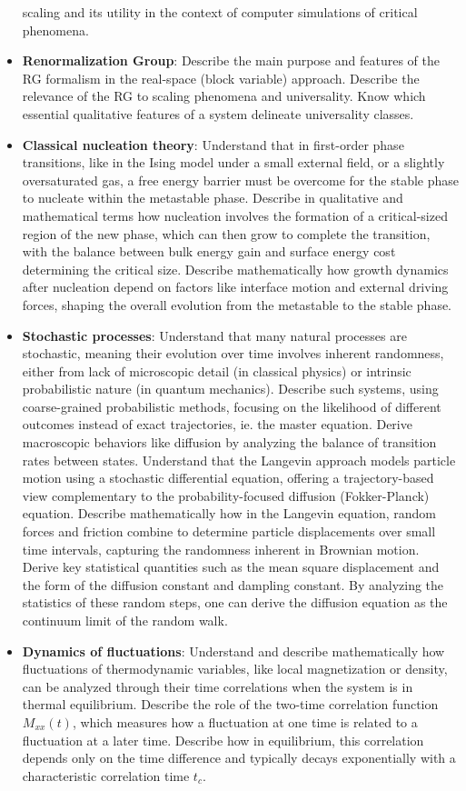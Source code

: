 \documentclass[
  letterpaper,
  enabledeprecatedfontcommands]{report}
\begin{document}
\begin{itemize}
  scaling and its utility in the context of computer simulations of
  critical phenomena.
\item
  \textbf{Renormalization Group}: Describe the main purpose and features
  of the RG formalism in the real-space (block variable) approach.
  Describe the relevance of the RG to scaling phenomena and
  universality. Know which essential qualitative features of a system
  delineate universality classes.
\item
  \textbf{Classical nucleation theory}: Understand that in first-order
  phase transitions, like in the Ising model under a small external
  field, or a slightly oversaturated gas, a free energy barrier must be
  overcome for the stable phase to nucleate within the metastable phase.
  Describe in qualitative and mathematical terms how nucleation involves
  the formation of a critical-sized region of the new phase, which can
  then grow to complete the transition, with the balance between bulk
  energy gain and surface energy cost determining the critical size.
  Describe mathematically how growth dynamics after nucleation depend on
  factors like interface motion and external driving forces, shaping the
  overall evolution from the metastable to the stable phase.
\item
  \textbf{Stochastic processes}: Understand that many natural processes
  are stochastic, meaning their evolution over time involves inherent
  randomness, either from lack of microscopic detail (in classical
  physics) or intrinsic probabilistic nature (in quantum mechanics).
  Describe such systems, using coarse-grained probabilistic methods,
  focusing on the likelihood of different outcomes instead of exact
  trajectories, ie. the master equation. Derive macroscopic behaviors
  like diffusion by analyzing the balance of transition rates between
  states. Understand that the Langevin approach models particle motion
  using a stochastic differential equation, offering a trajectory-based
  view complementary to the probability-focused diffusion
  (Fokker-Planck) equation. Describe mathematically how in the Langevin
  equation, random forces and friction combine to determine particle
  displacements over small time intervals, capturing the randomness
  inherent in Brownian motion. Derive key statistical quantities such as
  the mean square displacement and the form of the diffusion constant
  and dampling constant. By analyzing the statistics of these random
  steps, one can derive the diffusion equation as the continuum limit of
  the random walk.
\item
  \textbf{Dynamics of fluctuations}: Understand and describe
  mathematically how fluctuations of thermodynamic variables, like local
  magnetization or density, can be analyzed through their time
  correlations when the system is in thermal equilibrium. Describe the
  role of the two-time correlation function \(M_{xx}(t)\), which
  measures how a fluctuation at one time is related to a fluctuation at
  a later time. Describe how in equilibrium, this correlation depends
  only on the time difference and typically decays exponentially with a
  characteristic correlation time \(t_c\).
\end{itemize}
\end{document}
